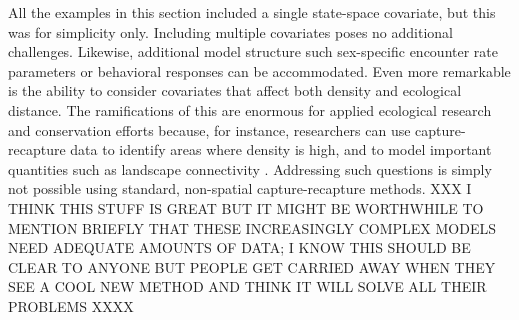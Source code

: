 All the examples in this section included a single state-space
covariate, but this was for simplicity only. Including multiple
covariates poses no additional challenges. Likewise, additional model
structure such sex-specific encounter rate parameters or behavioral
responses can be accommodated. Even more remarkable is the ability to
consider covariates that affect both density and ecological
distance. The ramifications of this are enormous for applied
ecological research and conservation efforts because, for instance,
researchers can use capture-recapture data to identify areas where
density is high, and to model important quantities such as landscape
connectivity \citep{royle_etal:2012ecol}. Addressing such questions
is simply not possible using standard, non-spatial capture-recapture
methods. XXX I THINK THIS STUFF IS GREAT BUT IT MIGHT BE WORTHWHILE TO MENTION BRIEFLY THAT THESE INCREASINGLY COMPLEX MODELS NEED ADEQUATE AMOUNTS OF DATA; I KNOW THIS SHOULD BE CLEAR TO ANYONE BUT PEOPLE GET CARRIED AWAY WHEN THEY SEE A COOL NEW METHOD AND THINK IT WILL SOLVE ALL THEIR PROBLEMS XXXX


